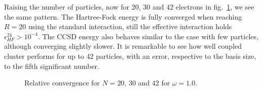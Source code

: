 Raising the number of particles, now for 20, 30 and 42 electrons in fig.~\ref{fig:results:convN20OM1}, we see the same pattern.
The Hartree-Fock energy is fully converged when reaching $R=20$ using the standard interaction, still the effective interaction holds $\epsilon^{24}_{HF} >  10^{-4}$.
The CCSD energy also behaves similar to the case with few particles, although converging slightly slower.
It is remarkable to see how well coupled cluster performs for up to 42 particles, with an error, respective to the basis size, to the fifth significant number.
\begin{figure}
\begin{center}
\caption{Relative convergence for $N=20$, $30$ and $42$ for $\omega =1.0$.}
\label{fig:results:convN20OM1}
\end{center}
\end{figure}


